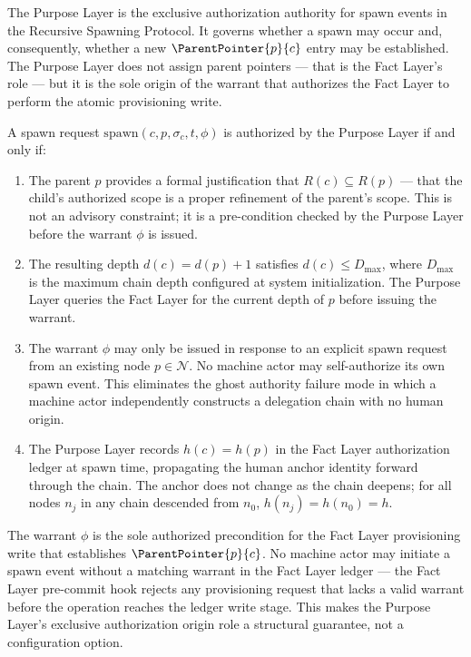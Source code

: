 The Purpose Layer is the exclusive authorization authority for spawn events in the Recursive Spawning Protocol. It governs whether a spawn may occur and, consequently, whether a new $\ParentPointer{p}{c}$ entry may be established. The Purpose Layer does not assign parent pointers --- that is the Fact Layer's role --- but it is the sole origin of the warrant that authorizes the Fact Layer to perform the atomic provisioning write.

\begin{dfn}
\label{dfn:rs-spawn-authorization}
A spawn request $\mathrm{spawn}(c, p, \sigma_c, t, \phi)$ is authorized by the Purpose Layer if and only if:

\begin{enumerate}
    \item[(SA1) \textbf{Scope refinement justification.}] The parent $p$ provides a formal justification that $R(c) \subseteq R(p)$ --- that the child's authorized scope is a proper refinement of the parent's scope. This is not an advisory constraint; it is a pre-condition checked by the Purpose Layer before the warrant $\phi$ is issued.

    \item[(SA2) \textbf{Depth availability.}] The resulting depth $d(c) = d(p) + 1$ satisfies $d(c) \leq D_{\max}$, where $D_{\max}$ is the maximum chain depth configured at system initialization. The Purpose Layer queries the Fact Layer for the current depth of $p$ before issuing the warrant.

    \item[(SA3) \textbf{No autonomous bootstrapping.}] The warrant $\phi$ may only be issued in response to an explicit spawn request from an existing node $p \in \mathcal{N}$. No machine actor may self-authorize its own spawn event. This eliminates the ghost authority failure mode in which a machine actor independently constructs a delegation chain with no human origin.

    \item[(SA4) \textbf{Human anchor propagation.}] The Purpose Layer records $h(c) = h(p)$ in the Fact Layer authorization ledger at spawn time, propagating the human anchor identity forward through the chain. The anchor does not change as the chain deepens; for all nodes $n_j$ in any chain descended from $n_0$, $h(n_j) = h(n_0) = h$.
\end{enumerate}
\end{dfn}

The warrant $\phi$ is the sole authorized precondition for the Fact Layer provisioning write that establishes $\ParentPointer{p}{c}$. No machine actor may initiate a spawn event without a matching warrant in the Fact Layer ledger --- the Fact Layer pre-commit hook rejects any provisioning request that lacks a valid warrant before the operation reaches the ledger write stage. This makes the Purpose Layer's exclusive authorization origin role a structural guarantee, not a configuration option.

